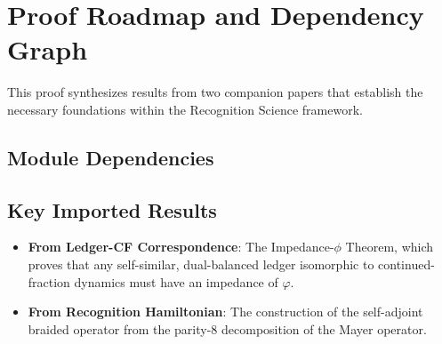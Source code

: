 \documentclass[11pt,a4paper]{article}
\theoremstyle{definition}
\theoremstyle{remark}
\begin{document}
\section{Proof Roadmap and Dependency Graph}\label{sec:roadmap}

This proof synthesizes results from two companion papers that establish the necessary foundations within the Recognition Science framework.

\subsection{Module Dependencies}

\begin{center}
\end{center}

\subsection{Key Imported Results}

\begin{itemize}
\item \textbf{From Ledger-CF Correspondence}: The Impedance-$\phi$ Theorem, which proves that any self-similar, dual-balanced ledger isomorphic to continued-fraction dynamics must have an impedance of $\varphi$.
\item \textbf{From Recognition Hamiltonian}: The construction of the self-adjoint braided operator from the parity-8 decomposition of the Mayer operator.
\end{itemize}
\end{document}
